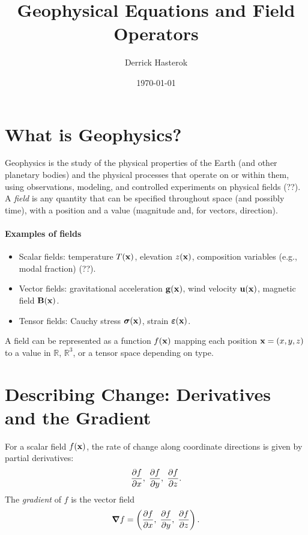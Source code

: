 \documentclass[11pt,a4paper]{article}
\title{Geophysical Equations and Field Operators}
\author{Derrick Hasterok}
\date{\today}
\begin{document}
\maketitle

\section{What is Geophysics?}
Geophysics is the study of the physical properties of the Earth (and other planetary bodies) and the physical processes that operate on or within them, using observations, modeling, and controlled experiments on physical fields (??). A \emph{field} is any quantity that can be specified throughout space (and possibly time), with a position and a value (magnitude and, for vectors, direction).

\paragraph{Examples of fields}
\begin{itemize}
  \item Scalar fields: temperature \(T(\vb{x})\), elevation \(z(\vb{x})\), composition variables (e.g., modal fraction) (??).
  \item Vector fields: gravitational acceleration \(\vb{g}(\vb{x})\), wind velocity \(\vb{u}(\vb{x})\), magnetic field \(\vb{B}(\vb{x})\).
  \item Tensor fields: Cauchy stress \(\bm{\sigma}(\vb{x})\), strain \(\bm{\varepsilon}(\vb{x})\).
\end{itemize}

A field can be represented as a function $f(\vb{x})$ mapping each position $\vb{x} = (x,y,z)$ to a value in $\mathbb{R}$, $\mathbb{R}^3$, or a tensor space depending on type.

\section{Describing Change: Derivatives and the Gradient}
For a scalar field $f(\vb{x})$, the rate of change along coordinate directions is given by partial derivatives:
\begin{equation}
  \pdv{f}{x},\; \pdv{f}{y},\; \pdv{f}{z} .
\end{equation}
The \emph{gradient} of $f$ is the vector field
\begin{equation}
  \grad f = \left( \pdv{f}{x},\; \pdv{f}{y},\; \pdv{f}{z} \right) .
\end{equation}
\end{document}
